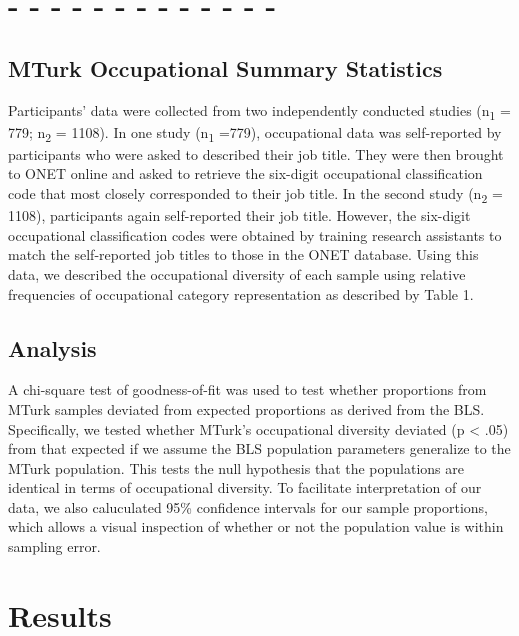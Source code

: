 \documentclass[english,man]{apa6}
\theoremstyle{definition}
\theoremstyle{definition}
\theoremstyle{remark}
\begin{document}
\section{- - - - - - - - - - - - -}\label{section-1}

\subsection{MTurk Occupational Summary
Statistics}\label{mturk-occupational-summary-statistics}

Participants' data were collected from two independently conducted
studies (n\textsubscript{1} = 779; n\textsubscript{2} = 1108). In one
study (n\textsubscript{1} =779), occupational data was self-reported by
participants who were asked to described their job title. They were then
brought to ONET online and asked to retrieve the six-digit occupational
classification code that most closely corresponded to their job title.
In the second study (n\textsubscript{2} = 1108), participants again
self-reported their job title. However, the six-digit occupational
classification codes were obtained by training research assistants to
match the self-reported job titles to those in the ONET database. Using
this data, we described the occupational diversity of each sample using
relative frequencies of occupational category representation as
described by Table 1.

\subsection{Analysis}\label{analysis}

A chi-square test of goodness-of-fit was used to test whether
proportions from MTurk samples deviated from expected proportions as
derived from the BLS. Specifically, we tested whether MTurk's
occupational diversity deviated (p \textless{} .05) from that expected
if we assume the BLS population parameters generalize to the MTurk
population. This tests the null hypothesis that the populations are
identical in terms of occupational diversity. To facilitate
interpretation of our data, we also caluculated 95\% confidence
intervals for our sample proportions, which allows a visual inspection
of whether or not the population value is within sampling error.

\section{Results}\label{results}
\end{document}
